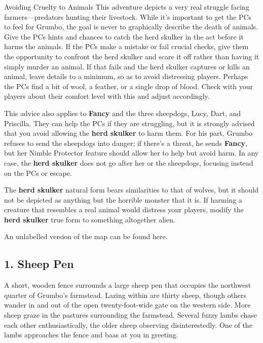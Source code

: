 \documentclass[10pt,a4paper,twoside,bg=print,twocolumn,openany,nodeprecatedcode]{dndbook}
\begin{document}
\begin{DndSidebar}[float=!b]{Avoiding Cruelty to Animals}
This adventure depicts a very real struggle facing farmers—predators hunting their livestock. While it's important to get the PCs to feel for Grumbo, the goal is never to graphically describe the death of animals. Give the PCs hints and chances to catch the herd skulker in the act before it harms the animals. If the PCs make a mistake or fail crucial checks, give them the opportunity to confront the herd skulker and scare it off rather than having it simply murder an animal. If that fails and the herd skulker captures or kills an animal, leave details to a minimum, so as to avoid distressing players. Perhaps the PCs find a bit of wool, a feather, or a single drop of blood. Check with your players about their comfort level with this and adjust accordingly.



This advice also applies to \textbf{Fancy} and the three sheepdogs, Lucy, Dart, and Priscilla. They can help the PCs if they are struggling, but it is strongly advised that you avoid allowing the \textbf{herd skulker} to harm them. For his part, Grumbo refuses to send the sheepdogs into danger; if there's a threat, he sends \textbf{Fancy}, but her Nimble Protector feature should allow her to help but avoid harm. In any case, the \textbf{herd skulker} does not go after her or the sheepdogs, focusing instead on the PCs or escape.



The \textbf{herd skulker} natural form bears similarities to that of wolves, but it should not be depicted as anything but the horrible monster that it is. If harming a creature that resembles a real animal would distress your players, modify the \textbf{herd skulker} true form to something altogether alien.



\end{DndSidebar}

An unlabelled version of the map can be found here.

\subsection{1. Sheep Pen}
\begin{DndReadAloud}{}
A short, wooden fence surrounds a large sheep pen that occupies the northwest quarter of Grumbo's farmstead. Lazing within are thirty sheep, though others wander in and out of the open twenty-foot-wide gate on the western side. More sheep graze in the pastures surrounding the farmstead. Several fuzzy lambs chase each other enthusiastically, the older sheep observing disinterestedly. One of the lambs approaches the fence and baas at you in greeting.

\end{DndReadAloud}
\end{document}
